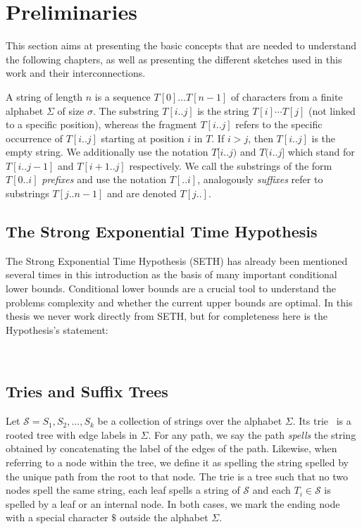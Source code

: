 \section{Preliminaries}\label{sec:prelim}

This section aims at presenting the basic concepts that are needed to understand the following chapters, as well as presenting the different sketches used in this work and their interconnections.

\noindent A string of length $n$ is a sequence $T[0] \dots T[n-1]$ of characters from a finite alphabet $\Sigma$ of size $\sigma$. The substring $T[i..j]$ is the string $T[i] \cdots T[j]$ (not linked to a specific position), whereas the fragment $T[i..j]$ refers to the specific occurrence of $T[i..j]$ starting at position $i$ in $T$. If $i > j$, then $T[i..j]$ is the empty string. We additionally use the notation $T[i..j)$ and $T(i..j]$ which stand for $T[i..j-1]$ and $T[i+1..j]$ respectively. We call the substrings of the form $T[0..i]$ \emph{prefixes}  and use the notation $T[..i]$, analogously \emph{suffixes} refer to substrings $T[j..n-1]$ and are denoted $T[j..]$.

\subsection{The Strong Exponential Time Hypothesis}

The Strong Exponential Time Hypothesis (SETH) has already been mentioned several times in this introduction as the basis of many important conditional lower bounds. Conditional lower bounds are a crucial tool to understand the problems complexity and whether the current upper bounds are optimal. In this thesis we never work directly from SETH, but for completeness here is the Hypothesis's statement:

\\

\subsection{Tries and Suffix Trees}\label{sec:prelim:tries}
Let $\mathcal{S} = {S_1,S_2, ..., S_k}$ be a collection of strings over the alphabet $\Sigma$. Its trie~\cite{thue1912gegenseitige,de1959file,fredkin1960trie} is a rooted tree with edge labels in $\Sigma$.
For any path, we say the path \emph{spells} the string obtained by concatenating the label of the edges of the path.
Likewise, when referring to a node within the tree, we define it as spelling the string spelled by the unique path from the root to that node.
The trie is a tree such that no two nodes spell the same string, each leaf spells a string of $\mathcal{S}$ and each $T_i \in \mathcal{S}$ is spelled by a leaf or an internal node. In both cases, we mark the ending node with a special character $\$$ outside the alphabet $\Sigma$.

